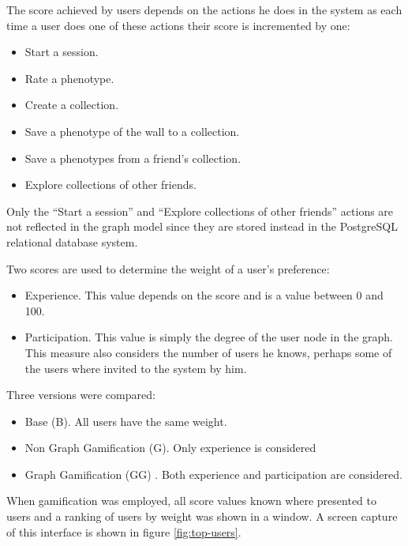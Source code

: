 \documentclass[conference]{IEEEtran}
\begin{document}
The score achieved by users depends on the actions he does in the system as
each time a user does one of these actions their score is incremented by one:
\begin{itemize}
\item Start a session.
\item Rate a phenotype.
\item Create a collection.
\item Save a phenotype of the wall to a collection.
\item Save a phenotypes from a friend's collection.
\item Explore collections of other friends.
\end{itemize}

Only the ``Start a session'' and ``Explore collections of other friends'' actions 
are not reflected in the graph model since they are stored instead in the PostgreSQL relational
database system. %

Two scores are used to determine the weight of a user's preference:
\begin{itemize}
\item Experience. This value depends on the score and is a value 
between 0 and 100. 

\item Participation. This value is simply the degree of the user node 
in the graph. This measure also considers the number of users he knows,
perhaps some of the users where invited to the system by him.   
\end{itemize}

Three versions were compared:
\begin{itemize}
\item Base (B). All users have the same weight.
\item Non Graph Gamification (G). Only experience is considered
\item Graph Gamification (GG) . Both experience and participation are considered.
\end{itemize}
When gamification was employed, all score values known where presented to users
and a ranking of users by weight was shown in a window. A screen capture of
this interface is shown in figure \ref{fig:top-users}. 
\end{document}
